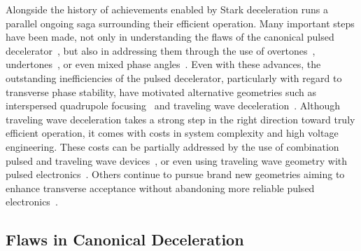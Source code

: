 Alongside the history of achievements enabled by Stark deceleration runs a parallel ongoing saga surrounding their efficient operation. 
Many important steps have been made, not only in understanding the flaws of the canonical pulsed decelerator~\cite{VanDeMeerakker2006,Sawyer2008a}, but also in addressing them through the use of overtones~\cite{VanDeMeerakker2005a,Scharfenberg2009}, undertones~\cite{Zhang2016}, or even mixed phase angles~\cite{Parazzoli2009,Hou2013}. 
Even with these advances, the outstanding inefficiencies of the pulsed decelerator, particularly with regard to transverse phase stability, have motivated alternative geometries such as interspersed quadrupole focusing~\cite{Sawyer2008a} and traveling wave deceleration~\cite{Osterwalder2010,VandenBerg2014,Fabrikant2014}. 
Although traveling wave deceleration takes a strong step in the right direction toward truly efficient operation, it comes with costs in system complexity and high voltage engineering. 
These costs can be partially addressed by the use of combination pulsed and traveling wave devices~\cite{Quintero-Perez2013}, or even using traveling wave geometry with pulsed electronics~\cite{Hou2016,Shyur2017}. 
Others continue to pursue brand new geometries aiming to enhance transverse acceptance without abandoning more reliable pulsed electronics~\cite{Wang2016}. 

\subsection{Flaws in Canonical Deceleration}


